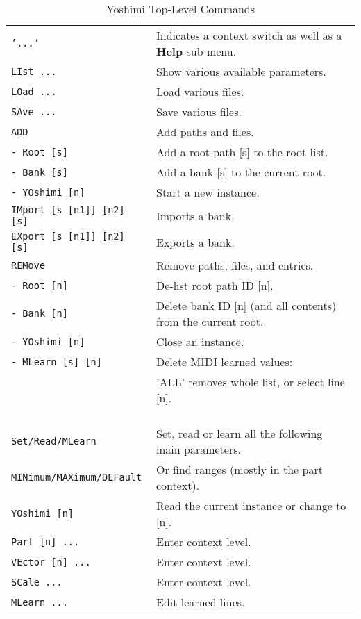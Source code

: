 \begin{center}
\begin{longtable}{p{6cm} p{10cm}}
\caption[Yoshimi Top-Level Commands]{Yoshimi Top-Level Commands} \\
\texttt{'...'} &
   Indicates a context switch as well as a \textbf{Help} sub-menu. \\
\texttt{LIst ...} &
   Show various available parameters. \\
\texttt{LOad ...} &
   Load various files. \\
\texttt{SAve ...} &
   Save various files. \\
\texttt{ADD} &
   Add paths and files. \\
\texttt{- Root [s]} &
   Add a root path [s] to the root list. \\
\texttt{- Bank [s]} &
   Add a bank [s] to the current root. \\
\texttt{- YOshimi [n]} &
   Start a new instance. \\
\texttt{IMport [s [n1]] [n2] [s]} &
   Imports a bank. \\
\texttt{EXport [s [n1]] [n2] [s]} &
   Exports a bank. \\
\texttt{REMove} &
   Remove paths, files, and entries. \\
\texttt{- Root [n]} &
   De-list root path ID [n]. \\
\texttt{- Bank [n]} &
   Delete bank ID [n] (and all contents) from the current root. \\
\texttt{- YOshimi [n]} &
   Close an instance. \\
\texttt{- MLearn [s] [n]} &
   Delete MIDI learned values: \\
\texttt{ } &
   'ALL' removes whole list, or select line [n]. \\
\texttt{ } & \\
\texttt{Set/Read/MLearn} &
   Set, read or learn all the following main parameters. \\
\texttt{MINimum/MAXimum/DEFault} &
   Or find ranges (mostly in the part context). \\
\texttt{YOshimi [n]} &
   Read the current instance or change to [n]. \\
\texttt{Part [n] ...} &
   Enter context level. \\
\texttt{VEctor [n] ...} &
   Enter context level. \\
\texttt{SCale ...} &
   Enter context level. \\
\texttt{MLearn ...} &
   Edit learned lines. \\

\end{longtable}
\end{center}
